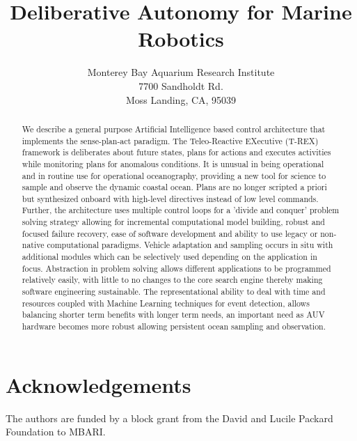 \documentclass[12pt]{svmono}
\title{\textbf{\sc Deliberative Autonomy for Marine Robotics}}
\author{}
\date{\small Monterey Bay Aquarium Research Institute \\
7700 Sandholdt Rd.\\
Moss Landing,  CA, 95039\\
{\tt }}
\begin{document}
\maketitle

\begin{abstract}

  We describe a general purpose Artificial Intelligence based control
  architecture that implements the sense-plan-act paradigm. The
  Teleo-Reactive EXecutive (T-REX) framework is deliberates about
  future states, plans for actions and executes activities while
  monitoring plans for anomalous conditions. It is unusual in being
  operational and in routine use for operational oceanography,
  providing a new tool for science to sample and observe the dynamic
  coastal ocean. Plans are no longer scripted a priori but synthesized
  onboard with high-level directives instead of low level
  commands. Further, the architecture uses multiple control loops for
  a 'divide and conquer' problem solving strategy allowing for
  incremental computational model building, robust and focused failure
  recovery, ease of software development and ability to use legacy or
  non-native computational paradigms. Vehicle adaptation and sampling
  occurs in situ with additional modules which can be selectively used
  depending on the application in focus. Abstraction in problem
  solving allows different applications to be programmed relatively
  easily, with little to no changes to the core search engine thereby
  making software engineering sustainable. The representational
  ability to deal with time and resources coupled with Machine
  Learning techniques for event detection, allows balancing shorter
  term benefits with longer term needs, an important need as AUV
  hardware becomes more robust allowing persistent ocean sampling and
  observation.
  

\end{abstract}















\section{Acknowledgements}

The authors are funded by a block grant from the David and Lucile
Packard Foundation to MBARI. 


\end{document}
